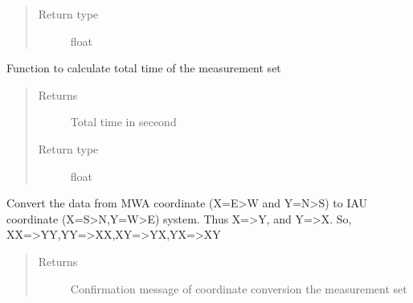 \documentclass[letterpaper,10pt,english]{sphinxmanual}
\begin{document}
\begin{fulllineitems}
\begin{fulllineitems}
\begin{quote}
\begin{description}
\item[{Return type}] \leavevmode
\sphinxAtStartPar
float

\end{description}\end{quote}

\end{fulllineitems}


\begin{fulllineitems}
\label{\detokenize{paircars:paircars.access_ms.AccessMS.calc_total_time}}
\sphinxAtStartPar
Function to calculate total time of the measurement set
\begin{quote}\begin{description}
\item[{Returns}] \leavevmode
\sphinxAtStartPar
Total time in seceond

\item[{Return type}] \leavevmode
\sphinxAtStartPar
float

\end{description}\end{quote}

\end{fulllineitems}


\begin{fulllineitems}
\label{\detokenize{paircars:paircars.access_ms.AccessMS.convert_mwa_to_iau}}
\sphinxAtStartPar
Convert the data from MWA coordinate (X=E\sphinxhyphen{}\textgreater{}W and Y=N\sphinxhyphen{}\textgreater{}S) to IAU coordinate (X=S\sphinxhyphen{}\textgreater{}N,Y=W\sphinxhyphen{}\textgreater{}E) system.
Thus X=\textgreater{}\sphinxhyphen{}Y, and Y=\textgreater{}\sphinxhyphen{}X. So, XX=\textgreater{}YY,YY=\textgreater{}XX,XY=\textgreater{}YX,YX=\textgreater{}XY
\begin{quote}\begin{description}
\item[{Returns}] \leavevmode
\sphinxAtStartPar
Confirmation message of coordinate conversion the measurement set


\end{description}
\end{quote}
\end{fulllineitems}
\end{fulllineitems}
\end{document}
